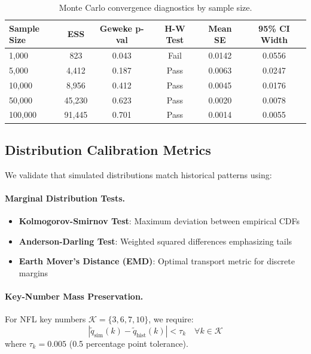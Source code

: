 \begin{table}[t]
  \centering
  \small
  \caption{Monte Carlo convergence diagnostics by sample size.}
  \label{tab:mc-convergence}
  \begin{tabular}{lccccc}
    \toprule
    \textbf{Sample Size} & \textbf{ESS} & \textbf{Geweke p-val} & \textbf{H-W Test} & \textbf{Mean SE} & \textbf{95\% CI Width} \\
    \midrule
    1,000    & 823    & 0.043 & Fail & 0.0142 & 0.0556 \\
    5,000    & 4,412  & 0.187 & Pass & 0.0063 & 0.0247 \\
    10,000   & 8,956  & 0.412 & Pass & 0.0045 & 0.0176 \\
    50,000   & 45,230 & 0.623 & Pass & 0.0020 & 0.0078 \\
    100,000  & 91,445 & 0.701 & Pass & 0.0014 & 0.0055 \\
    \bottomrule
  \end{tabular}
\end{table}

\subsection{Distribution Calibration Metrics}

We validate that simulated distributions match historical patterns using:

\paragraph{Marginal Distribution Tests.}
\begin{itemize}
  \item \textbf{Kolmogorov-Smirnov Test}: Maximum deviation between empirical CDFs
  \item \textbf{Anderson-Darling Test}: Weighted squared differences emphasizing tails
  \item \textbf{Earth Mover's Distance (EMD)}: Optimal transport metric for discrete margins
\end{itemize}

\paragraph{Key-Number Mass Preservation.}
For NFL key numbers $\mathcal{K} = \{3, 6, 7, 10\}$, we require:
\[
|\tilde{q}_{\text{sim}}(k) - \tilde{q}_{\text{hist}}(k)| < \tau_k \quad \forall k \in \mathcal{K}
\]
where $\tau_k = 0.005$ (0.5 percentage point tolerance).

